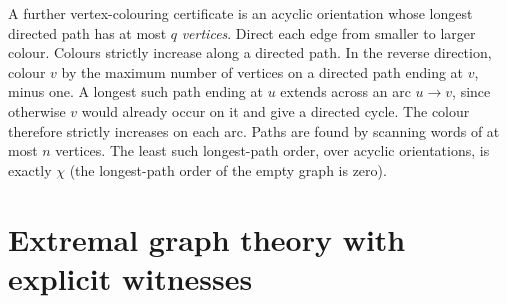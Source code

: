 A further vertex-colouring certificate is an acyclic orientation whose
longest directed path has at most $q$ \emph{vertices}. Direct each edge
from smaller to larger colour. Colours strictly increase along a directed
path. In the reverse direction, colour $v$ by the maximum number of
vertices on a directed path ending at $v$, minus one. A longest such path
ending at $u$ extends across an arc $u\to v$, since otherwise $v$ would
already occur on it and give a directed cycle. The colour therefore
strictly increases on each arc. Paths are found by scanning words of at
most $n$ vertices. The least such longest-path order, over acyclic
orientations, is exactly $\chi$ (the longest-path order of the empty graph
is zero).

\section{Extremal graph theory with explicit witnesses}\label{co:extremal}
